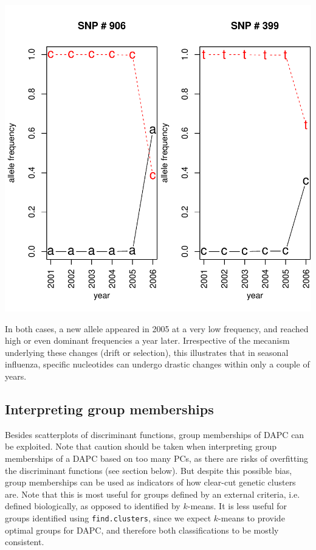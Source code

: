 \documentclass{article}
\begin{document}
\includegraphics{figs/dapc-019}

In both cases, a new allele appeared in 2005 at a very low frequency, and reached high or even dominant frequencies a
year later.
Irrespective of the mecanism underlying these changes (drift or selection), this illustrates that in
seasonal influenza, specific nucleotides can undergo drastic changes within only a couple of years.




\subsection{Interpreting group memberships}
Besides scatterplots of discriminant functions, group memberships of DAPC can be exploited.
Note that caution should be taken when interpreting group memberships of a DAPC based on too many
PCs, as there are risks of overfitting the discriminant functions (see section below).
But despite this possible bias, group memberships can be used as indicators of how
clear-cut genetic clusters are.
Note that this is most useful for groups defined by an external criteria, i.e. defined biologically, as opposed to identified by $k$-means.
It is less useful for groups identified using \texttt{find.clusters}, since we expect $k$-means to
provide optimal groups for DAPC, and therefore both classifications to be mostly consistent.
\\
\end{document}
